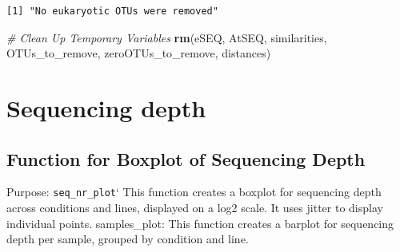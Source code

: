 \documentclass[
  11pt,
]{article}
\newenvironment{Shaded}{\begin{snugshade}}{\end{snugshade}}
\newcommand{\CommentTok}[1]{\textcolor[rgb]{0.56,0.35,0.01}{\textit{#1}}}
\newcommand{\FunctionTok}[1]{\textcolor[rgb]{0.13,0.29,0.53}{\textbf{#1}}}
\newcommand{\NormalTok}[1]{#1}
\begin{document}
\begin{verbatim}
[1] "No eukaryotic OTUs were removed"
\end{verbatim}

\begin{Shaded}
\begin{Highlighting}[]
\CommentTok{\# Clean Up Temporary Variables}
\FunctionTok{rm}\NormalTok{(eSEQ, AtSEQ, similarities, OTUs\_to\_remove, zeroOTUs\_to\_remove, distances)}
\end{Highlighting}
\end{Shaded}

\section{Sequencing depth}\label{sequencing-depth}

\subsection{Function for Boxplot of Sequencing
Depth}\label{function-for-boxplot-of-sequencing-depth}

Purpose: \texttt{seq\_nr\_plot}` This function creates a boxplot for
sequencing depth across conditions and lines, displayed on a log2 scale.
It uses jitter to display individual points. samples\_plot: This
function creates a barplot for sequencing depth per sample, grouped by
condition and line.
\end{document}
